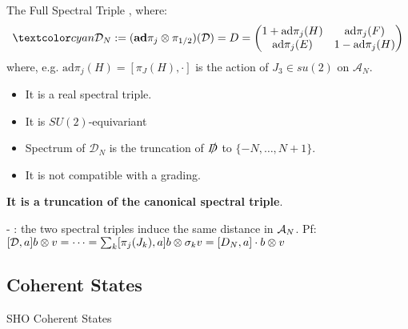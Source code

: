 \begin{frame}{The Full Spectral Triple} %
, where:
\begin{multline}
    \lbtext{\mathcal D_N} := (\textbf{ad}\pi_j \otimes \pi_{1/2})(\mathcal D) = D = \begin{pmatrix} 1 + \text{ad}\pi_j(H) & \text{ad}\pi_j(F) \\ \text{ad}\pi_j(E) & 1 - \text{ad}\pi_j(H)\end{pmatrix} 
\end{multline}
where, e.g. $\text{ad}\pi_j(H) = [\pi_J(H), \cdot ]$ is the action of $J_3 \in su(2)$ on $\mathcal A_N$.

    \begin{itemize}
    
    \item It is a real spectral triple.
    
    \item It is $SU(2)$-equivariant
    
    \item Spectrum of $\mathcal D_N$ is the truncation of $\slashed D$ to $\{-N, \dots, N+1\}$.%
    
    \item It is not compatible with a grading.
    
    \end{itemize}

\textbf{It is a truncation of the canonical spectral triple}.

- : the two spectral triples induce the same distance in $\mathcal A_N$. Pf: $[\mathcal D, a]b \otimes v = \cdots = \sum_k [\pi_j(J_k), a]b \otimes \sigma_k v = [D_N, a] \cdot b \otimes v$
\end{frame}

\subsection{Coherent States}

\begin{frame}{SHO Coherent States} %

\end{frame}

